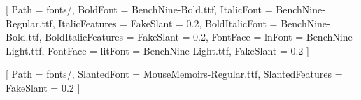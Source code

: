 
\usepackage[dvipsnames]{xcolor}  %
\usepackage{relsize}

\usepackage{iftex}  %

\ifTUTeX  %
    \newfontfamily{}[
        Path = fonts/,
        BoldFont = BenchNine-Bold.ttf,
        ItalicFont = BenchNine-Regular.ttf,
        ItalicFeatures = {FakeSlant = 0.2},
        BoldItalicFont = BenchNine-Bold.ttf,
        BoldItalicFeatures = {FakeSlant = 0.2},
        FontFace = {l}{n}{Font = BenchNine-Light.ttf},
        FontFace = {l}{it}{Font = BenchNine-Light.ttf, FakeSlant = 0.2}
    ]
    
    \newfontfamily{}[
        Path = fonts/,
        SlantedFont = MouseMemoirs-Regular.ttf,
        SlantedFeatures = {FakeSlant = 0.2}
    ]

\else 

    \newcommand{\fontMouseMemoirs}{
        \fontfamily{MouseMemoirs-TLF}\selectfont
    }
\fi

\newcommand{\useCustomFont}[2]  %
    {\slshape\textcolor{RoyalPurple}{#1\larger[1]#2}}  %
